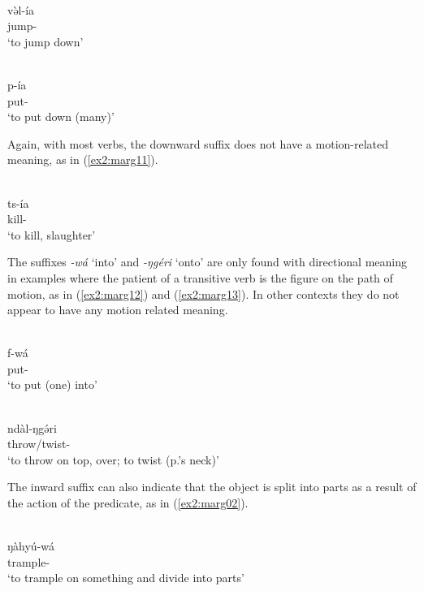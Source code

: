 \ea\label{ex2:marg9}
 \\
\gll  və̀l-ía	\\
jump-		\\
\glt `to jump down'

\ex\label{ex2:marg10}
 \\
\gll p-ía	\\
put-	\\
\glt `to put down (many)'
\z

Again, with most verbs, the downward suffix does not have a motion-related meaning, as in (\ref{ex2:marg11}). 

\ea\label{ex2:marg11}
 \\
\gll ts-ía	\\
kill- \\
\glt `to kill, slaughter'
\z 

The suffixes \textit{-wá} `into' and \textit{-ŋgéri} `onto' are only found with directional meaning in examples where the patient of a transitive verb is the figure on the path of motion, as in (\ref{ex2:marg12}) and (\ref{ex2:marg13}).  In other contexts they do not appear to have any motion related meaning.

\ea\label{ex2:marg12}
 \\
\gll  f-wá	\\
put-		\\
\glt `to put (one) into'

\ex\label{ex2:marg13}
 \\
\gll  ndàl-ŋgə́ri	\\
throw/twist- \\
\glt `to throw on top, over; to twist (p.'s neck)'
\z

The inward suffix can also indicate that the object is split into parts as a result of the action of the predicate, as in (\ref{ex2:marg02}). 

\ea\label{ex2:marg02}
 \\
\gll ŋàhyú-wá \\
trample-	\\
\glt `to trample on something and divide into parts'
\z 

